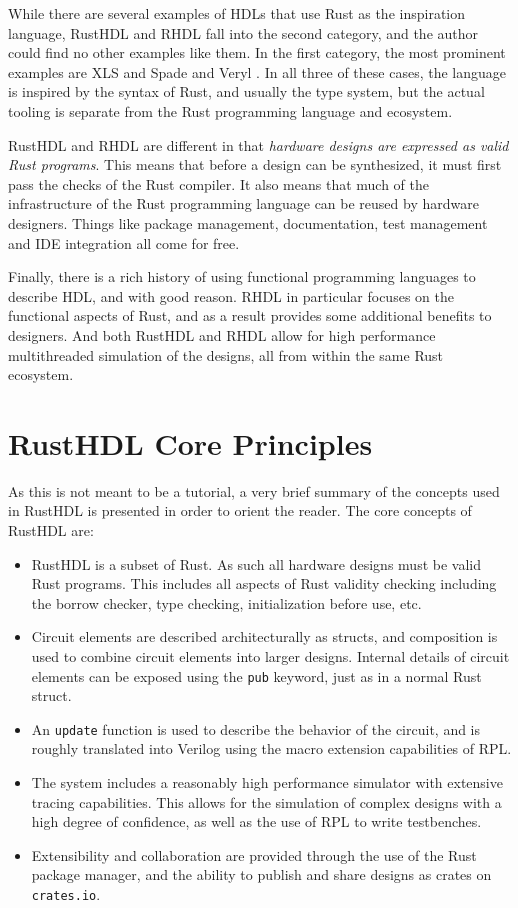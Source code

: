 \documentclass[conference]{IEEEtran}
\begin{document}
While there are several examples of HDLs that use Rust as the inspiration language, RustHDL and
RHDL fall into the second category, and the author could find no other examples like them.  In the 
first category, the most prominent examples are XLS \cite{b4} and Spade \cite{b1} and Veryl \cite{b5}.  
In all three of these cases, the language is inspired by the syntax of Rust, and usually the type
system, but the actual tooling is separate from the Rust programming language and ecosystem.

RustHDL and RHDL are different in that \emph{hardware designs are expressed as valid Rust programs}.
This means that before a design can be synthesized, it must first pass the checks of the Rust
compiler.   It also means that much of the infrastructure of the Rust programming language can be reused
by hardware designers.  Things like package management, documentation, test management and IDE 
integration all come for free.

Finally, there is a rich history of using functional programming languages to describe HDL, and
with good reason.  RHDL in particular focuses on the functional aspects of Rust, and as a result 
provides some additional benefits to designers.  And both RustHDL and RHDL allow for high performance 
multithreaded simulation of the designs, all from within the same Rust ecosystem.

\section{RustHDL Core Principles}\label{sec:core}

As this is not meant to be a tutorial, a very brief summary of the concepts used in RustHDL is presented
in order to orient the reader.  The core concepts of RustHDL are:

\begin{itemize}
  \item RustHDL is a subset of Rust.  As such all hardware designs must be valid Rust programs.  This includes
  all aspects of Rust validity checking including the borrow checker, type checking, initialization before 
  use, etc.
  \item Circuit elements are described architecturally as structs, and composition is used to combine 
  circuit elements into larger designs. Internal details of circuit elements can be exposed using the 
  \verb|pub| keyword, just as in a normal Rust struct.
  \item An \verb|update| function is used to describe the behavior of the circuit, and is roughly
  translated into Verilog using the macro extension capabilities of RPL.
  \item The system includes a reasonably high performance simulator with extensive tracing capabilities.
  This allows for the simulation of complex designs with a high degree of confidence, as well as 
  the use of RPL to write testbenches.
  \item Extensibility and collaboration are provided through the use of the Rust package manager, and 
  the ability to publish and share designs as crates on \verb|crates.io|.
\end{itemize}
\end{document}
